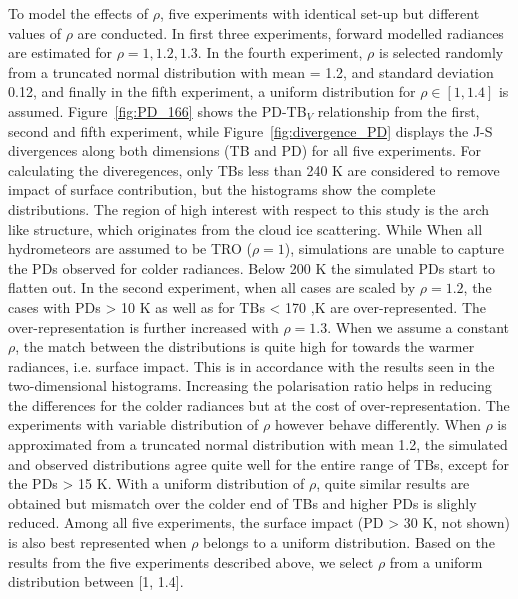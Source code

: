 \documentclass[amt, manuscript]{copernicus}
\begin{document}
To model the effects of $\rho$, five experiments with identical set-up but different values of $\rho$ are conducted. In first three experiments, forward modelled radiances are estimated for $\rho = 1, 1.2, 1.3$. In the fourth experiment, $\rho$ is selected randomly from a truncated normal distribution with mean = 1.2, and standard deviation 0.12, and finally in the fifth experiment, a uniform distribution for $\rho\in[1, 1.4]$ is assumed. Figure~\ref{fig:PD_166} shows the PD-TB$_V$ relationship from the first, second and fifth experiment, while  Figure~\ref{fig:divergence_PD} displays the J-S divergences along both dimensions (TB and PD) for all five experiments.  For calculating the diveregences, only TBs less than 240\,\,K are considered to remove impact of surface contribution, but the histograms show the complete distributions. The region of high interest with respect to this study is the arch like structure, which originates from the cloud ice scattering. While When all hydrometeors are assumed to be TRO ($\rho = 1$), simulations are unable to capture the PDs observed for colder radiances. Below 200\,\,K the simulated PDs start to flatten out. In the second experiment, when all cases are scaled by $\rho = 1.2$, the cases with PDs > 10\,\,K as well as for TBs < 170\,\,,K are over-represented. The over-representation is further increased with $\rho = 1.3$. When we assume a constant $\rho$, the match between the distributions is quite high for towards the warmer radiances, i.e. surface impact. This is in accordance with the results seen in the two-dimensional histograms. Increasing the polarisation ratio helps in reducing the differences for the colder radiances but at the cost of over-representation. The experiments with variable distribution of $\rho$ however behave differently. When $\rho$ is approximated from a truncated normal distribution with mean 1.2, the simulated and observed distributions agree quite well for the entire range of TBs, except for the PDs > 15\,\,K. With a uniform distribution of $\rho$, quite similar results are obtained but mismatch over the colder end of TBs and higher PDs is slighly reduced. Among all five experiments, the surface impact (PD > 30\,\,K, not shown) is also best represented when $\rho$ belongs to a uniform distribution. Based on the results from the five experiments described above, we select $\rho$ from a uniform distribution between [1, 1.4].
\end{document}
